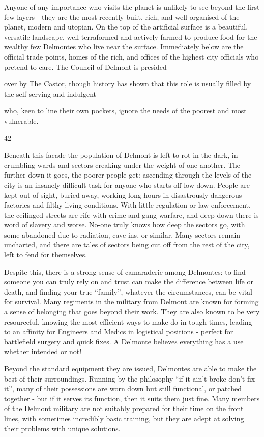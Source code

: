 \documentclass{scrbook}
\begin{document}
Anyone of any importance who visits the planet is unlikely to see beyond the first few layers - they are the most recently built, rich, and well-organised of the planet, modern and utopian. On the top of the artificial surface is a beautiful, versatile landscape, well-terraformed and actively farmed to produce food for the wealthy few Delmontes who live near the surface. Immediately below are the official trade points, homes of the rich, and offices of the highest city officials who pretend to care. The Council of Delmont is presided

over by The Castor, though history has shown that this role is usually filled by the self-serving and indulgent

who, keen to line their own pockets, ignore the needs of the poorest and most vulnerable.

42

Beneath this facade the population of Delmont is left to rot in the dark, in crumbling wards and sectors creaking under the weight of one another. The further down it goes, the poorer people get: ascending through the levels of the city is an insanely difficult task for anyone who starts off low down. People are kept out of sight, buried away, working long hours in disastrously dangerous factories and filthy living conditions. With little regulation or law enforcement, the ceilinged streets are rife with crime and gang warfare, and deep down there is word of slavery and worse. No-one truly knows how deep the sectors go, with some abandoned due to radiation, cave-ins, or similar. Many sectors remain uncharted, and there are tales of sectors being cut off from the rest of the city, left to fend for themselves.

Despite this, there is a strong sense of camaraderie among Delmontes: to find someone you can truly rely on and trust can make the difference between life or death, and finding your true ``family'', whatever the circumstances, can be vital for survival. Many regiments in the military from Delmont are known for forming a sense of belonging that goes beyond their work. They are also known to be very resourceful, knowing the most efficient ways to make do in tough times, leading to an affinity for Engineers and Medics in logistical positions - perfect for battlefield surgery and quick fixes. A Delmonte believes everything has a use whether intended or not!

Beyond the standard equipment they are issued, Delmontes are able to make the best of their surroundings. Running by the philosophy ``if it ain't broke don't fix it'', many of their possessions are worn down but still functional, or patched together - but if it serves its function, then it suits them just fine. Many members of the Delmont military are not suitably prepared for their time on the front lines, with sometimes incredibly basic training, but they are adept at solving their problems with unique solutions.
\end{document}
